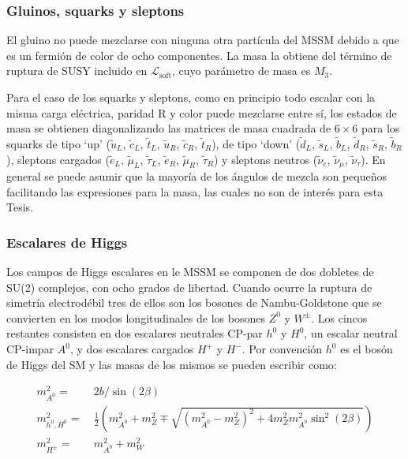 \subsubsection{Gluinos, squarks y sleptons}

El gluino no puede mezclarse con ninguna otra partícula del MSSM debido a
que es un fermión de color de ocho componentes. La masa la obtiene del término de ruptura de SUSY incluido en $\mathcal{L}_{\text{soft}}$, cuyo parámetro de masa es $M_3$.

Para el caso de los squarks y sleptons, como en principio todo escalar con la misma carga eléctrica, paridad R y color puede mezclarse entre sí, los estados de masa se obtienen diagonalizando las matrices de masa cuadrada de $6\times6$ para los squarks de tipo `up' ($\tilde{u}_L$, $\tilde{c}_L$, $\tilde{t}_L$, $\tilde{u}_R$, $\tilde{c}_R$, $\tilde{t}_R$), de tipo `down' ($\tilde{d}_L$, $\tilde{s}_L$, $\tilde{b}_L$, $\tilde{d}_R$, $\tilde{s}_R$, $\tilde{b}_R$), sleptons cargados ($\tilde{e}_L$, $\tilde{\mu}_L$, $\tilde{\tau}_L$, $\tilde{e}_R$, $\tilde{\mu}_R$, $\tilde{\tau}_R$) y sleptons neutros ($\tilde{\nu}_e$, $\tilde{\nu}_{\mu}$, $\tilde{\nu}_{\tau}$). 
En general se puede asumir que la mayoría de los ángulos de mezcla son pequeños facilitando las expresiones para la masa, las cuales no son de interés para esta Tesis.


\subsubsection{Escalares de Higgs}

Los campos de Higgs escalares en le MSSM se componen de dos dobletes de SU(2) complejos, con ocho grados de libertad. Cuando ocurre la ruptura de simetría electrodébil tres de ellos son los bosones de Nambu-Goldstone que se convierten en los modos longitudinales de los bosones $Z^0$ y $W^{\pm}$. Los cincos restantes consisten en dos escalares neutrales CP-par $h^0$ y $H^0$, un escalar neutral CP-impar $A^0$, y dos escalares cargados $H^+$ y $H^-$. Por convención $h^0$ es el bosón de Higgs del SM y las masas de los mismos se pueden escribir como:

\begin{equation}
	\begin{split}
		m_{A^0}^2 = &\ 2b/\sin(2\beta) \\
		m_{h^0 , H^0}^2 = &\ \frac{1}{2}\left( m_{A^0}^2 + m_Z^2 \mp \sqrt{(m_{A^0}^2-m_Z^2)^2 + 4m_Z^2 m_{A^0}^2 \sin^2(2\beta)} \right) \\
		m_{H^{\pm}}^2 = &\ m_{A^0}^2 + m_W^2 \\
	\end{split}
\end{equation}


